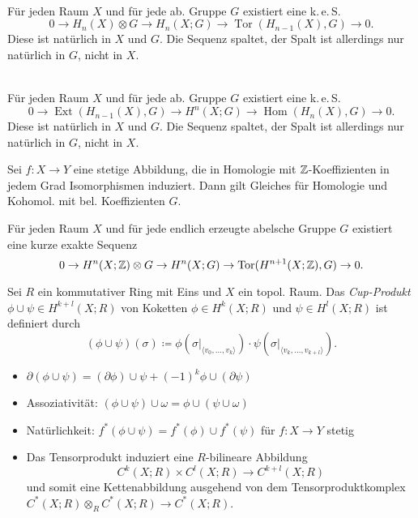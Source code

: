 \documentclass{cheat-sheet}
\newcommand{\angles}[1]{{\langle #1 \rangle}}
\DeclareMathOperator{\Hom}{Hom} %
\DeclareMathOperator{\Tor}{Tor}
\DeclareMathOperator{\Ext}{Ext}
\newcommand{\keS}{k.\,e.\,S.} %
\begin{document}

\begin{satz}\mbox{}\\
  Für jeden Raum $X$ und für jede ab. Gruppe $G$ existiert eine \keS{}
  \[ 0 \to H_n(X) \otimes G \to H_n(X; G) \to \Tor(H_{n-1}(X), G) \to 0. \]
  Diese ist natürlich in $X$ und $G$. Die Sequenz spaltet, der Spalt ist allerdings nur natürlich in $G$, nicht in $X$.
\end{satz}

\begin{satz}\mbox{}\\
  Für jeden Raum $X$ und für jede ab. Gruppe $G$ existiert eine \keS{}
  \[ 0 \to \Ext(H_{n-1}(X), G) \to H^n(X; G) \to \Hom(H_n(X), G) \to 0. \]
  Diese ist natürlich in $X$ und $G$. Die Sequenz spaltet, der Spalt ist allerdings nur natürlich in $G$, nicht in $X$.
\end{satz}

\begin{kor}
  Sei $f : X \to Y$ eine stetige Abbildung, die in Homologie mit $\mathbb{Z}$-Koeffizienten in jedem Grad Isomorphismen induziert. Dann gilt Gleiches für Homologie und Kohomol. mit bel. Koeffizienten $G$.
\end{kor}

\begin{satz}
  Für jeden Raum $X$ und für jede endlich erzeugte abelsche Gruppe $G$ existiert eine kurze exakte Sequenz
  \[ 0 \to H^n(X; \Z) \otimes G \to H^n(X; G) \to \Tor(H^{n+1}(X; \Z), G) \to 0. \]
\end{satz}



\begin{defn}
  Sei $R$ ein kommutativer Ring mit Eins und $X$ ein topol. Raum. Das \emph{Cup-Produkt} $\phi \cup \psi \in H^{k+l}(X; R)$ von Koketten $\phi \in H^k(X; R)$ und $\psi \in H^l(X; R)$ ist definiert durch
  \[ (\phi \cup \psi)(\sigma) \coloneqq \phi(\sigma|_\angles{v_0, \ldots, v_k}) \cdot \psi(\sigma|_\angles{v_k, \ldots, v_{k+l}}). \]
\end{defn}

\begin{lem}
  \begin{itemize}
    \item $\partial (\phi \cup \psi) = (\partial \phi) \cup \psi + (-1)^k \phi \cup (\partial \psi)$
    \item Assoziativität: $(\phi \cup \psi) \cup \omega = \phi \cup (\psi \cup \omega)$
    \item Natürlichkeit: $f^*(\phi \cup \psi) = f^*(\phi) \cup f^*(\psi)$ für $f : X \to Y$ stetig
    \item Das Tensorprodukt induziert eine $R$-bilineare Abbildung
    \[ C^k(X; R) \times C^l(X; R) \to C^{k+l}(X; R) \]
    und somit eine Kettenabbildung ausgehend von dem Tensorproduktkomplex
    $C^*(X; R) \otimes_R C^*(X; R) \to C^*(X; R)$.
  \end{itemize}
\end{lem}
\end{document}
